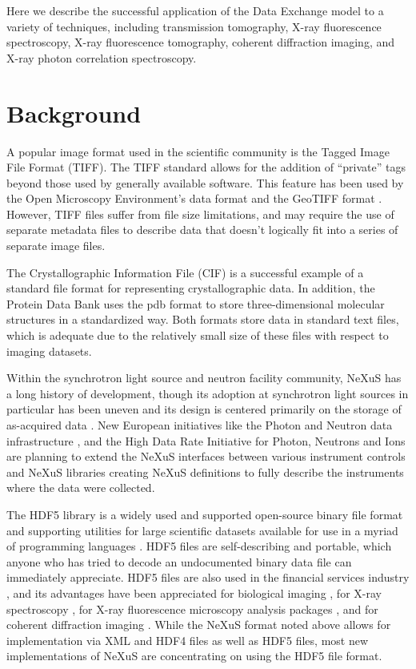 \documentclass[pdf]{iucr}              %
\begin{document}
Here we describe the successful application of the Data Exchange model to a variety of techniques, including transmission tomography, X-ray fluorescence spectroscopy, X-ray fluorescence tomography, coherent diffraction imaging, and X-ray photon correlation spectroscopy.

\section{Background}

A popular image format used in the scientific community is the Tagged Image File Format (TIFF). The TIFF standard allows for the addition of ``private'' tags beyond those used by generally available software. This feature has been used by the Open Microscopy Environment's data format \cite{OME-TIFF} and the GeoTIFF format \cite{GeoTIFF}. However, TIFF files suffer from file size limitations, and may require the use of separate metadata files to describe data that doesn't logically fit into a series of separate image files.

The Crystallographic Information File (CIF) is a successful example of a standard file format for representing crystallographic data. In addition, the Protein Data Bank uses the pdb format \cite{pdb} to store three-dimensional molecular structures in a standardized way. Both formats store data in standard text files, which is adequate due to the relatively small size of these files with respect to imaging datasets.

Within the synchrotron light source and neutron facility community, NeXuS \cite{Tischler1984} has a long history of development, though its adoption at synchrotron light sources in particular has been uneven and its design is centered primarily on the storage of as-acquired data \cite{NeXuS}. New European initiatives like the Photon and Neutron data infrastructure \cite{PanData_2013}, and the High Data Rate Initiative for Photon, Neutrons and Ions \cite{PNI_HDRI_2013} are planning to extend the NeXuS interfaces between various instrument controls and NeXuS libraries creating NeXuS definitions to fully describe the instruments where the data were collected. 

The HDF5 library is a widely used and supported open-source binary file format and supporting utilities for large scientific datasets available for use in a myriad of programming languages \cite{HDF5}. HDF5 files are self-describing and portable, which anyone who has tried to decode an undocumented binary data file can immediately appreciate. HDF5 files are also used in the financial services industry \cite{Bethel_2011}, and its advantages have been appreciated for biological imaging \cite{dougherty_cacm_2009,eliceiri_nm_2012}, for X-ray spectroscopy
\cite{ravel_jsr_2012,medjoubi_jsr_2013}, for X-ray fluorescence microscopy analysis packages \cite{vogt_jdp_2003,sole_sab_2007}, and for coherent diffraction imaging \cite{steinbrener_oe_2010,maia_nm_2012}. While the NeXuS format noted above allows for implementation via XML and HDF4 files as well as HDF5 files, most new implementations of NeXuS are concentrating on using the HDF5 file format.
\end{document}
